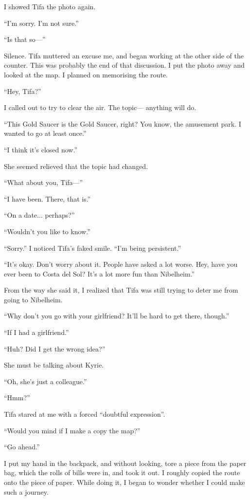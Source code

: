 \documentclass[oneside]{book}
\begin{document}
I showed Tifa the photo again.

“I’m sorry. I’m not sure.”

“Is that so—”

Silence. Tifa muttered an excuse me, and began working at the other side of the counter. This was probably the end of that discussion. I put the photo away and looked at the map. I planned on memorising the route.

“Hey, Tifa?”

I called out to try to clear the air. The topic— anything will do.

“This Gold Saucer is the Gold Saucer, right? You know, the amusement park. I wanted to go at least once.”

“I think it’s closed now.”

She seemed relieved that the topic had changed.

“What about you, Tifa—”

“I have been. There, that is.”

“On a date... perhaps?”

“Wouldn’t you like to know.”

“Sorry.” I noticed Tifa’s faked smile. “I’m being persistent.”

“It’s okay. Don’t worry about it. People have asked a lot worse. Hey, have you ever been to Costa del Sol? It’s a lot more fun than Nibelheim.”

From the way she said it, I realized that Tifa was still trying to deter me from going to Nibelheim.

“Why don’t you go with your girlfriend? It’ll be hard to get there, though.”

“If I had a girlfriend.”

“Huh? Did I get the wrong idea?”

She must be talking about Kyrie.

“Oh, she’s just a colleague.”

“Hmm?”

Tifa stared at me with a forced “doubtful expression”.

“Would you mind if I make a copy the map?”

“Go ahead.”

I put my hand in the backpack, and without looking, tore a piece from the paper bag, which the rolls of bills were in, and took it out. I roughly copied the route onto the piece of paper. While doing it, I began to wonder whether I could make such a journey.
\end{document}

